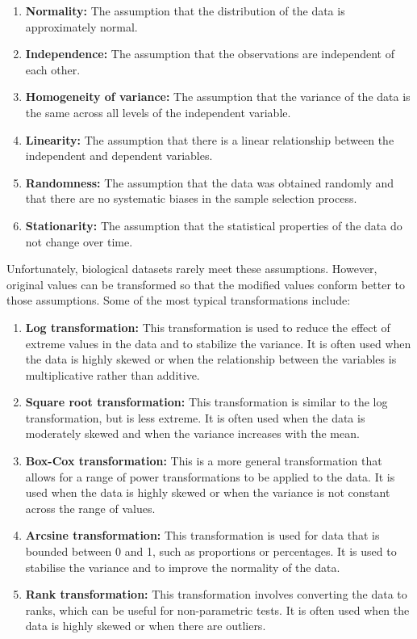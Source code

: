 \documentclass[
]{book}
\providecommand{\tightlist}{%
  \setlength{\itemsep}{0pt}\setlength{\parskip}{0pt}}
\begin{document}
\begin{enumerate}
\def\labelenumi{\arabic{enumi}.}
\tightlist
\item
  \textbf{Normality:} The assumption that the distribution of the data is approximately normal.
\item
  \textbf{Independence:} The assumption that the observations are independent of each other.
\item
  \textbf{Homogeneity of variance:} The assumption that the variance of the data is the same across all levels of the independent variable.
\item
  \textbf{Linearity:} The assumption that there is a linear relationship between the independent and dependent variables.
\item
  \textbf{Randomness:} The assumption that the data was obtained randomly and that there are no systematic biases in the sample selection process.
\item
  \textbf{Stationarity:} The assumption that the statistical properties of the data do not change over time.
\end{enumerate}

Unfortunately, biological datasets rarely meet these assumptions. However, original values can be transformed so that the modified values conform better to those assumptions. Some of the most typical transformations include:

\begin{enumerate}
\def\labelenumi{\arabic{enumi}.}
\tightlist
\item
  \textbf{Log transformation:} This transformation is used to reduce the effect of extreme values in the data and to stabilize the variance. It is often used when the data is highly skewed or when the relationship between the variables is multiplicative rather than additive.
\item
  \textbf{Square root transformation:} This transformation is similar to the log transformation, but is less extreme. It is often used when the data is moderately skewed and when the variance increases with the mean.
\item
  \textbf{Box-Cox transformation:} This is a more general transformation that allows for a range of power transformations to be applied to the data. It is used when the data is highly skewed or when the variance is not constant across the range of values.
\item
  \textbf{Arcsine transformation:} This transformation is used for data that is bounded between 0 and 1, such as proportions or percentages. It is used to stabilise the variance and to improve the normality of the data.
\item
  \textbf{Rank transformation:} This transformation involves converting the data to ranks, which can be useful for non-parametric tests. It is often used when the data is highly skewed or when there are outliers.
\end{enumerate}
\end{document}
